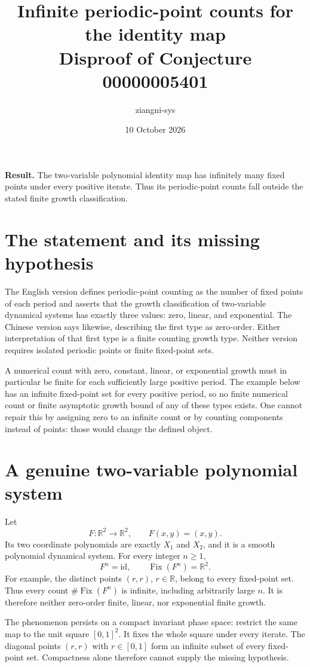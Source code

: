 \documentclass[11pt]{article}
\title{Infinite periodic-point counts for the identity map\\\large Disproof of Conjecture 00000005401}
\author{ziangni-sys}\date{10 October 2026}
\begin{document}
\maketitle
\noindent\textbf{Result.} The two-variable polynomial identity map has infinitely many fixed points under every positive iterate. Thus its periodic-point counts fall outside the stated finite growth classification.

\section*{The statement and its missing hypothesis}
The English version defines periodic-point counting as the number of fixed points of each period and asserts that the growth classification of two-variable dynamical systems has exactly three values: zero, linear, and exponential. The Chinese version says likewise, describing the first type as zero-order. Either interpretation of that first type is a finite counting growth type. Neither version requires isolated periodic points or finite fixed-point sets.

A numerical count with zero, constant, linear, or exponential growth must in particular be finite for each sufficiently large positive period. The example below has an infinite fixed-point set for every positive period, so no finite numerical count or finite asymptotic growth bound of any of these types exists. One cannot repair this by assigning zero to an infinite count or by counting components instead of points: those would change the defined object.

\section*{A genuine two-variable polynomial system}
Let
\[
 F:\mathbb R^2\longrightarrow\mathbb R^2,\qquad F(x,y)=(x,y).
\]
Its two coordinate polynomials are exactly $X_1$ and $X_2$, and it is a smooth polynomial dynamical system. For every integer $n\ge1$,
\[
 F^n=\mathrm{id},\qquad
 \operatorname{Fix}(F^n)=\mathbb R^2.
\]
For example, the distinct points $(r,r)$, $r\in\mathbb R$, belong to every fixed-point set. Thus every count $\#\operatorname{Fix}(F^n)$ is infinite, including arbitrarily large $n$. It is therefore neither zero-order finite, linear, nor exponential finite growth.

The phenomenon persists on a compact invariant phase space: restrict the same map to the unit square $[0,1]^2$. It fixes the whole square under every iterate. The diagonal points $(r,r)$ with $r\in[0,1]$ form an infinite subset of every fixed-point set. Compactness alone therefore cannot supply the missing hypothesis.
\end{document}
